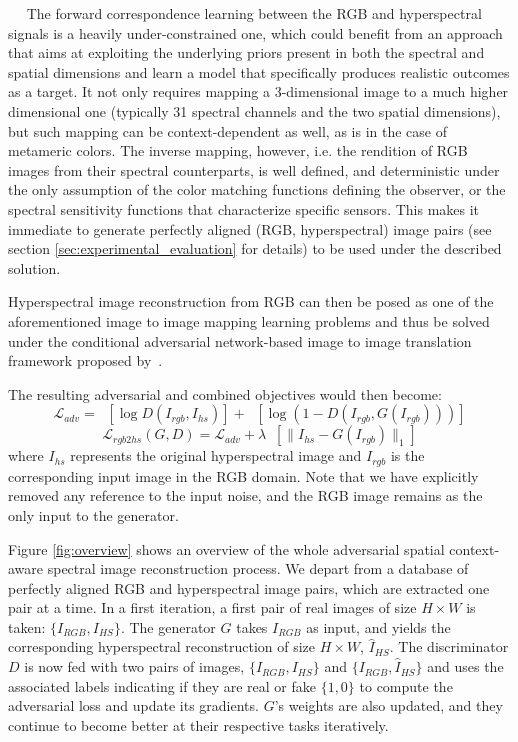 \documentclass{bmvc2k}
\newcommand{\minisection}[1]{\vspace{0.04in} \noindent {\bf #1}\ \ }
\begin{document}
\minisection{Adversarial spectral reconstruction networks} The forward correspondence learning between the RGB and hyperspectral signals is a heavily under-constrained one, which could benefit from an approach that aims at exploiting the underlying priors present in both the spectral and spatial dimensions and learn a model that specifically produces realistic outcomes as a target. 
It not only requires mapping a 3-dimensional image to a  much higher dimensional one (typically 31 spectral channels and the two spatial dimensions), but such mapping can be context-dependent as well, as is in the case of metameric colors.
The inverse mapping, however, i.e. the rendition of RGB images from their spectral counterparts, is well defined, and deterministic under the only assumption of the color matching functions defining the observer, or the spectral sensitivity functions that characterize specific sensors.
This makes it immediate to generate perfectly aligned (RGB, hyperspectral) image pairs (see section \ref{sec:experimental_evaluation} for details) to be used under the described solution.

Hyperspectral image reconstruction from RGB can then be posed as one of the aforementioned image to image mapping learning problems and thus be solved under the conditional adversarial network-based image to image translation framework proposed by~\cite{pix2pix2016}.

The resulting adversarial and combined objectives would then become:
\begin{equation} \label{eq:l_hscgan}
\mathcal{L}_{adv} = \mathop{\mathbb{E}_{I_{rgb},I_{hs}\sim p_{data}(I_{rgb},I_{hs})}} [\log D(I_{rgb}, I_{hs})] + \mathop{\mathbb{E}_{I_{rgb}\sim p_{data}(I_{rgb})}} [\log(1-D(I_{rgb},G(I_{rgb})))]
\end{equation}
\begin{equation} \label{eq:ltot}
\mathcal{L}_{rgb2hs}(G,D) = \mathcal{L}_{adv} + \lambda\mathop{\mathbb{E}_{I_{rgb},I_{hs}\sim p_{data}(I_{rgb},I_{hs})}} [\|I_{hs}-G(I_{rgb})\|_1]
\end{equation}
where $I_{hs}$ represents the original hyperspectral image and $I_{rgb}$ is the corresponding input image in the RGB domain. Note that we have explicitly removed any reference to the input noise, and the RGB image remains as the only input to the generator. 

Figure \ref{fig:overview} shows an overview of the whole adversarial spatial context-aware spectral image reconstruction process. We depart from a database of perfectly aligned RGB and hyperspectral image pairs, which are extracted one pair at a time. In a first iteration, a first pair of real images of size $H\times W$ is taken: $\{I_{RGB}, I_{HS}\}$. The generator $G$ takes $I_{RGB}$ as input, and yields the corresponding hyperspectral reconstruction of size $H\times W$, $\hat{I}_{HS}$. The discriminator $D$ is now fed with two pairs of images, $\{I_{RGB}, I_{HS}\}$ and $\{I_{RGB}, \hat{I}_{HS}\}$ and uses the associated labels indicating if they are real or fake $\{1,0\}$ to compute the adversarial loss and update its gradients. $G$'s weights are also updated, and they continue to become better at their respective tasks iteratively.
\end{document}
